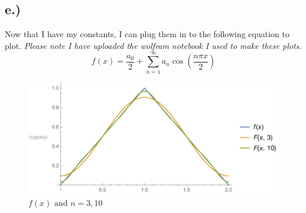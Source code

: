 \documentclass{article}
\begin{document}
\subsection*{e.)}
Now that I have my constants, I can plug them in to the following equation to plot. \textit{Please note I have uploaded the wolfram notebook I used to make these plots.}
\begin{equation}
f(x) = \frac{a_0}{2} + \sum_{n=1}^{\infty} a_n\cos(\frac{n\pi x}{2})
\end{equation}
\begin{figure}[H]
  \centering
    \includegraphics[width=\textwidth, scale = 1.25]{hw_9_plots.pdf}
    \caption{$f(x) \text{ and } n = 3, 10$}
\end{figure}
\end{document}
